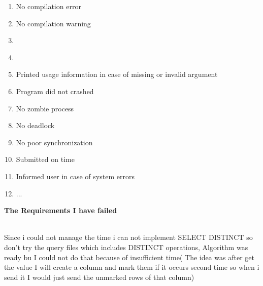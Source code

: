 \documentclass{report}
\begin{document}
\begin{enumerate}
    \item {\large No compilation error }
    \item {\large No compilation warning}
    \item {\large {} }
    \item {\large {}}
    \item {\large Printed usage information in case of missing or invalid argument}
    \item {\large Program did not crashed}
    \item {\large No zombie process}
    \item {\large No deadlock}
    \item {\large No poor synchronization}
    \item {\large Submitted on time}
    \item {\large Informed user in case of system errors}
    \item {\large ...}
    
\end{enumerate}

{\huge \textbf{The Requirements I have failed} \\}

{\large \\Since i could not manage the time i can not implement SELECT DISTINCT so don't try the query files which includes DISTINCT operations, Algorithm was ready bu I could not do that because of insufficient time( The idea was after get the value I will create a  column and mark them if it occurs second time so when i send it I would just send the unmarked rows of that column)}
\end{document}
